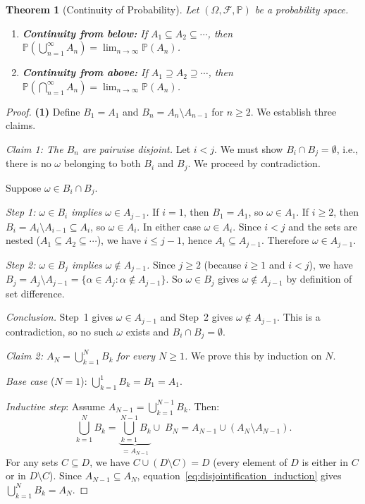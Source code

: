 \documentclass[11pt,a4paper]{article}
\theoremstyle{definition}
\theoremstyle{plain}
\newtheorem{theorem}{Theorem}[section]
\theoremstyle{remark}
\newcommand{\Prob}{\mathbb{P}}
\begin{document}
\begin{theorem}[Continuity of Probability]
\label{thm:continuity}
Let $(\Omega, \mathcal{F}, \Prob)$ be a probability space.
\begin{enumerate}[nosep]
    \item \textbf{Continuity from below:} If $A_1 \subseteq A_2 \subseteq \cdots$, then $\Prob\!\left(\bigcup_{n=1}^\infty A_n\right) = \lim_{n \to \infty} \Prob(A_n)$.
    \item \textbf{Continuity from above:} If $A_1 \supseteq A_2 \supseteq \cdots$, then $\Prob\!\left(\bigcap_{n=1}^\infty A_n\right) = \lim_{n \to \infty} \Prob(A_n)$.
\end{enumerate}
\end{theorem}

\begin{proof}
\textbf{(1)} Define $B_1 = A_1$ and $B_n = A_n \setminus A_{n-1}$ for $n \geq 2$. We establish three claims.

\medskip
\textit{Claim 1: The $B_n$ are pairwise disjoint.}
Let $i < j$. We must show $B_i \cap B_j = \emptyset$, i.e., there is no $\omega$ belonging to both $B_i$ and $B_j$. We proceed by contradiction.

Suppose $\omega \in B_i \cap B_j$.

\emph{Step 1: $\omega \in B_i$ implies $\omega \in A_{j-1}$.}
If $i = 1$, then $B_1 = A_1$, so $\omega \in A_1$. If $i \geq 2$, then $B_i = A_i \setminus A_{i-1} \subseteq A_i$, so $\omega \in A_i$.
In either case $\omega \in A_i$. Since $i < j$ and the sets are nested ($A_1 \subseteq A_2 \subseteq \cdots$), we have $i \leq j - 1$, hence $A_i \subseteq A_{j-1}$. Therefore $\omega \in A_{j-1}$.

\emph{Step 2: $\omega \in B_j$ implies $\omega \notin A_{j-1}$.}
Since $j \geq 2$ (because $i \geq 1$ and $i < j$), we have $B_j = A_j \setminus A_{j-1} = \{\alpha \in A_j : \alpha \notin A_{j-1}\}$.
So $\omega \in B_j$ gives $\omega \notin A_{j-1}$ by definition of set difference.

\emph{Conclusion.}
Step~1 gives $\omega \in A_{j-1}$ and Step~2 gives $\omega \notin A_{j-1}$. This is a contradiction, so no such $\omega$ exists and $B_i \cap B_j = \emptyset$.

\medskip
\textit{Claim 2: $A_N = \bigcup_{k=1}^N B_k$ for every $N \geq 1$.}
We prove this by induction on $N$.

\emph{Base case} ($N = 1$): $\bigcup_{k=1}^1 B_k = B_1 = A_1$. \checkmark

\emph{Inductive step}: Assume $A_{N-1} = \bigcup_{k=1}^{N-1} B_k$. Then:
\begin{equation}
    \bigcup_{k=1}^N B_k = \underbrace{\bigcup_{k=1}^{N-1} B_k}_{= A_{N-1}} \cup\; B_N
    = A_{N-1} \cup (A_N \setminus A_{N-1}).
    \label{eq:disjointification_induction}
\end{equation}
For any sets $C \subseteq D$, we have $C \cup (D \setminus C) = D$ (every element of $D$ is either in $C$ or in $D \setminus C$). Since $A_{N-1} \subseteq A_N$, equation~\eqref{eq:disjointification_induction} gives $\bigcup_{k=1}^N B_k = A_N$. \checkmark


\end{proof}
\end{document}
